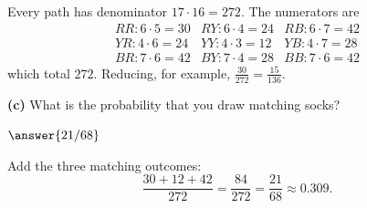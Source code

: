 \documentclass[12pt]{ximera}
\begin{document}
\begin{problem}
\begin{prompt}
\begin{feedback}
Every path has denominator $17\cdot 16=272$. The numerators are
\[
\begin{array}{lll}
RR: 6\cdot 5=30 & RY: 6\cdot 4=24 & RB: 6\cdot 7=42\\
YR: 4\cdot 6=24 & YY: 4\cdot 3=12 & YB: 4\cdot 7=28\\
BR: 7\cdot 6=42 & BY: 7\cdot 4=28 & BB: 7\cdot 6=42
\end{array}
\]
which total $272$. \checkmark Reducing, for example, $\frac{30}{272}=\frac{15}{136}$.
\end{feedback}
\end{prompt}

\begin{prompt}
\textbf{(c)} What is the probability that you draw matching socks?

$\answer{21/68}$

\begin{feedback}
Add the three matching outcomes:
\[
\frac{30+12+42}{272}=\frac{84}{272}=\frac{21}{68}\approx 0.309.
\]
\end{feedback}
\end{prompt}
\end{problem}
\end{document}
